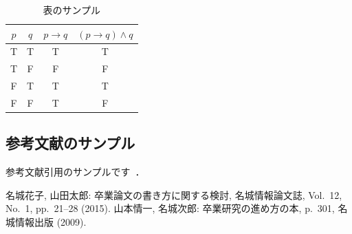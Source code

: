 \documentclass[a4paper,uplatex]{ujarticle}
\begin{document}
\begin{論文概要}
\begin{table}[ht]
\centering
\caption{表のサンプル}
\label{tbl:sample1}
\begin{tabular}{|c|c||c|c|} \hline
$p$ & $q$ & $p\rightarrow q$ & $(p\rightarrow q)\wedge q$ \\ \hline
T & T & T & T \\ \hline
T & F & F & F \\ \hline
F & T & T & T \\ \hline
F & F & T & F \\ \hline
\end{tabular}
\end{table}

\subsection{参考文献のサンプル}
参考文献引用のサンプルです~\cite{paper1}\cite{paper2}．


\begin{thebibliography}{9}
名城花子, 山田太郎: 卒業論文の書き方に関する検討, 名城情報論文誌,
  Vol.~12, No.~1, pp.~21--28 (2015).
山本情一, 名城次郎: 卒業研究の進め方の本, p.~301, 名城情報出版 (2009).
\end{thebibliography}

\end{論文概要} %
\end{document}
